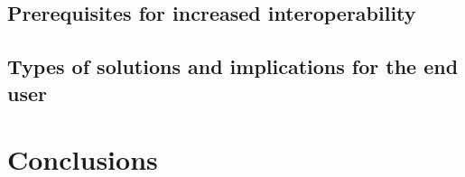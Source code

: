 \documentclass[12pt]{article}
\begin{document}
\subsection{ Prerequisites for increased interoperability}

\subsection{Types of solutions and implications for the end user}


\section{Conclusions}


\newpage

\begin{appendix}


\end{appendix}

\newpage

 
 
\end{document}
